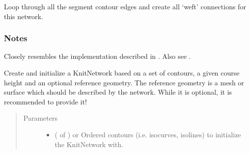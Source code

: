 \documentclass[letterpaper,10pt,english]{sphinxmanual}
\begin{document}
\begin{fulllineitems}

\begin{fulllineitems}
\label{\detokenize{cockatoo:cockatoo.KnitNetwork.create_final_weft_connections}}
Loop through all the segment contour edges and create all ‘weft’
connections for this network.
\subsubsection*{Notes}

Closely resembles the implementation described in  \sphinxfootnotemark[1]. Also see
 \sphinxfootnotemark[2].

\end{fulllineitems}


\begin{fulllineitems}
\label{\detokenize{cockatoo:cockatoo.KnitNetwork.create_from_contours}}
Create and initialize a KnitNetwork based on a set of contours, a
given course height and an optional reference geometry.
The reference geometry is a mesh or surface which should be described
by the network. While it is optional, it is  recommended to
provide it!
\begin{quote}\begin{description}
\item[{Parameters}] \leavevmode\begin{itemize}
\item {} 
 ( of ) \textendash{} or 
Ordered contours (i.e. isocurves, isolines) to initialize the
KnitNetwork with.


\end{itemize}
\end{description}
\end{quote}
\end{fulllineitems}
\end{fulllineitems}
\end{document}
